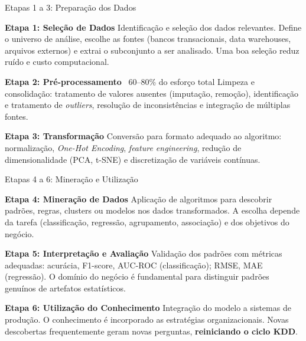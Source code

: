 \documentclass[aspectratio=169]{beamer}
\begin{document}
\begin{frame}{Etapas 1 a 3: Preparação dos Dados}
    \footnotesize
    \begin{block}{\textcolor{mineblue}{\textbf{Etapa 1: Seleção de Dados}}}
        Identificação e seleção dos dados relevantes. Define o universo de análise, escolhe as fontes (bancos transacionais, data warehouses, arquivos externos) e extrai o subconjunto a ser analisado. Uma boa seleção reduz ruído e custo computacional.
    \end{block}
    \vspace{0.2cm}
    \begin{alertblock}{\textbf{Etapa 2: Pré-processamento} \hfill {\small\faWarning\ 60--80\% do esforço total}}
        Limpeza e consolidação: tratamento de valores ausentes (imputação, remoção), identificação e tratamento de \textit{outliers}, resolução de inconsistências e integração de múltiplas fontes.
    \end{alertblock}
    \vspace{0.2cm}
    \begin{block}{\textcolor{minegreen}{\textbf{Etapa 3: Transformação}}}
        Conversão para formato adequado ao algoritmo: normalização, \textit{One-Hot Encoding}, \textit{feature engineering}, redução de dimensionalidade (PCA, t-SNE) e discretização de variáveis contínuas.
    \end{block}
\end{frame}

\begin{frame}{Etapas 4 a 6: Mineração e Utilização}
    \footnotesize
    \begin{block}{\textcolor{minered}{\textbf{Etapa 4: Mineração de Dados}}}
        Aplicação de algoritmos para descobrir padrões, regras, clusters ou modelos nos dados transformados. A escolha depende da tarefa (classificação, regressão, agrupamento, associação) e dos objetivos do negócio.
    \end{block}
    \vspace{0.2cm}
    \begin{block}{\textcolor{minegreen}{\textbf{Etapa 5: Interpretação e Avaliação}}}
        Validação dos padrões com métricas adequadas: acurácia, F1-score, AUC-ROC (classificação); RMSE, MAE (regressão). O domínio do negócio é fundamental para distinguir padrões genuínos de artefatos estatísticos.
    \end{block}
    \vspace{0.2cm}
    \begin{exampleblock}{\textcolor{mineorange}{\textbf{Etapa 6: Utilização do Conhecimento}}}
        Integração do modelo a sistemas de produção. O conhecimento é incorporado as estratégias organizacionais. Novas descobertas frequentemente geram novas perguntas, \textbf{reiniciando o ciclo KDD}.
    \end{exampleblock}
\end{frame}
\end{document}

